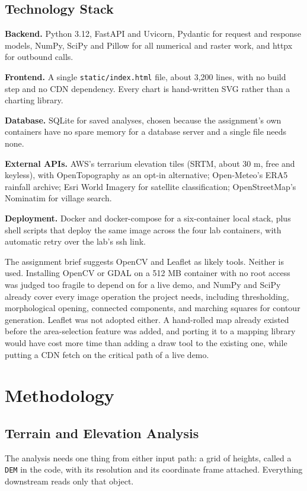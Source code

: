 \documentclass[manuscript,screen,review]{acmart}
\begin{document}
\subsection{Technology Stack}
\textbf{Backend.} Python 3.12, FastAPI and Uvicorn, Pydantic for request and response
models, NumPy, SciPy and Pillow for all numerical and raster work, and httpx for
outbound calls.

\textbf{Frontend.} A single \texttt{static/index.html} file, about 3,200 lines, with no
build step and no CDN dependency. Every chart is hand-written SVG rather than a
charting library.

\textbf{Database.} SQLite for saved analyses, chosen because the assignment's own
containers have no spare memory for a database server and a single file needs none.

\textbf{External APIs.} AWS's terrarium elevation tiles (SRTM, about 30 m, free and
keyless), with OpenTopography as an opt-in alternative; Open-Meteo's ERA5 rainfall
archive; Esri World Imagery for satellite classification; OpenStreetMap's Nominatim for
village search.

\textbf{Deployment.} Docker and docker-compose for a six-container local stack, plus
shell scripts that deploy the same image across the four lab containers, with automatic
retry over the lab's ssh link.

The assignment brief suggests OpenCV and Leaflet as likely tools. Neither is used.
Installing OpenCV or GDAL on a 512 MB container with no root access was judged too
fragile to depend on for a live demo, and NumPy and SciPy already cover every image
operation the project needs, including thresholding, morphological opening, connected
components, and marching squares for contour generation. Leaflet was not adopted
either. A hand-rolled map already existed before the area-selection feature was added,
and porting it to a mapping library would have cost more time than adding a draw tool
to the existing one, while putting a CDN fetch on the critical path of a live demo.

\section{Methodology}
\label{sec:methodology}

\subsection{Terrain and Elevation Analysis}
The analysis needs one thing from either input path: a grid of heights, called a
\texttt{DEM} in the code, with its resolution and its coordinate frame attached.
Everything downstream reads only that object.
\end{document}
